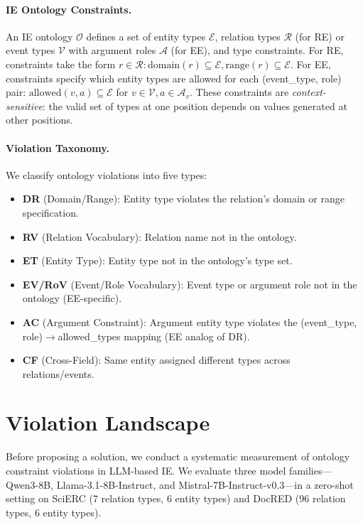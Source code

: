 \documentclass[11pt]{article}
\begin{document}
\paragraph{IE Ontology Constraints.}
An IE ontology $\mathcal{O}$ defines a set of entity types $\mathcal{E}$, relation types $\mathcal{R}$ (for RE) or event types $\mathcal{V}$ with argument roles $\mathcal{A}$ (for EE), and type constraints.
For RE, constraints take the form $r \in \mathcal{R}: \text{domain}(r) \subseteq \mathcal{E}, \text{range}(r) \subseteq \mathcal{E}$.
For EE, constraints specify which entity types are allowed for each (event\_type, role) pair: $\text{allowed}(v, a) \subseteq \mathcal{E}$ for $v \in \mathcal{V}, a \in \mathcal{A}_v$.
These constraints are \emph{context-sensitive}: the valid set of types at one position depends on values generated at other positions.

\paragraph{Violation Taxonomy.}
We classify ontology violations into five types:
\begin{itemize}[nosep,leftmargin=*]
\item \textbf{DR} (Domain/Range): Entity type violates the relation's domain or range specification.
\item \textbf{RV} (Relation Vocabulary): Relation name not in the ontology.
\item \textbf{ET} (Entity Type): Entity type not in the ontology's type set.
\item \textbf{EV/RoV} (Event/Role Vocabulary): Event type or argument role not in the ontology (EE-specific).
\item \textbf{AC} (Argument Constraint): Argument entity type violates the (event\_type, role)$\to$allowed\_types mapping (EE analog of DR).
\item \textbf{CF} (Cross-Field): Same entity assigned different types across relations/events.
\end{itemize}

\section{Violation Landscape}
\label{sec:landscape}

Before proposing a solution, we conduct a systematic measurement of ontology constraint violations in LLM-based IE.
We evaluate three model families---Qwen3-8B, Llama-3.1-8B-Instruct, and Mistral-7B-Instruct-v0.3---in a zero-shot setting on SciERC (7 relation types, 6 entity types) and DocRED (96 relation types, 6 entity types).
\end{document}
